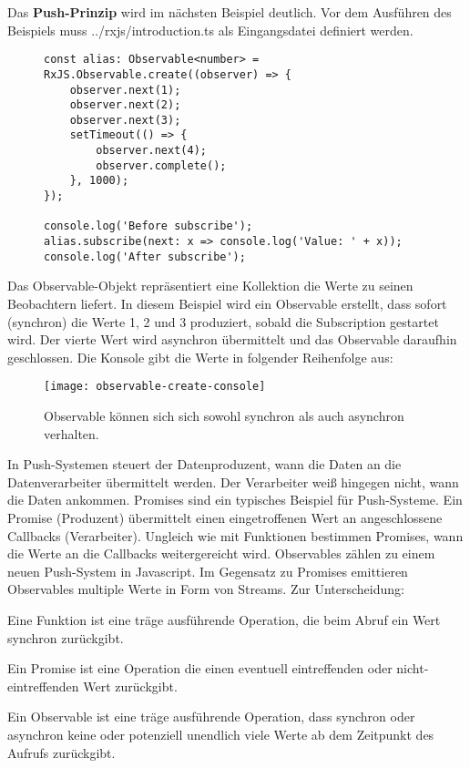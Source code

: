 \noindent
Das \textbf{Push-Prinzip} wird im nächsten Beispiel deutlich. Vor dem Ausführen des Beispiels muss ../rxjs/introduction.ts als Eingangsdatei definiert werden.

\begin{figure}[H]
\begin{lstlisting}[basicstyle=\small]
const alias: Observable<number> = RxJS.Observable.create((observer) => {
    observer.next(1);
    observer.next(2);
    observer.next(3);
    setTimeout(() => {
        observer.next(4);
        observer.complete();
    }, 1000);
});

console.log('Before subscribe');
alias.subscribe(next: x => console.log('Value: ' + x));
console.log('After subscribe');
\end{lstlisting}
\end{figure}

\noindent
Das Observable-Objekt repräsentiert eine Kollektion die Werte zu seinen Beobachtern liefert. In diesem Beispiel wird ein Observable erstellt, dass sofort (synchron) die Werte 1, 2 und 3 produziert, sobald die Subscription gestartet wird. Der vierte Wert wird asynchron übermittelt und das Observable daraufhin geschlossen. Die Konsole gibt die Werte in folgender Reihenfolge aus:

\begin{figure}[H]
\begin{center}
\texttt{[image: observable-create-console]}
\end{center}
\caption{Observable können sich sich sowohl synchron als auch asynchron verhalten.}
\end{figure}

\noindent
In Push-Systemen steuert der Datenproduzent, wann die Daten an die Datenverarbeiter übermittelt werden. Der Verarbeiter weiß hingegen nicht, wann die Daten ankommen. Promises sind ein typisches Beispiel für Push-Systeme. Ein Promise (Produzent) übermittelt einen eingetroffenen Wert an angeschlossene Callbacks (Verarbeiter). Ungleich wie mit Funktionen bestimmen Promises, wann die Werte an die Callbacks weitergereicht wird. Observables zählen zu einem neuen Push-System in Javascript. Im Gegensatz zu Promises emittieren Observables multiple Werte in Form von Streams. Zur Unterscheidung:

\begin{description}
\item Eine Funktion ist eine träge ausführende Operation, die beim Abruf ein Wert synchron zurückgibt.
\item Ein Promise ist eine Operation die einen eventuell eintreffenden oder nicht-eintreffenden Wert zurückgibt.
\item Ein Observable ist eine träge ausführende Operation, dass synchron oder asynchron keine oder potenziell unendlich viele Werte ab dem Zeitpunkt des Aufrufs zurückgibt.
\end{description}


